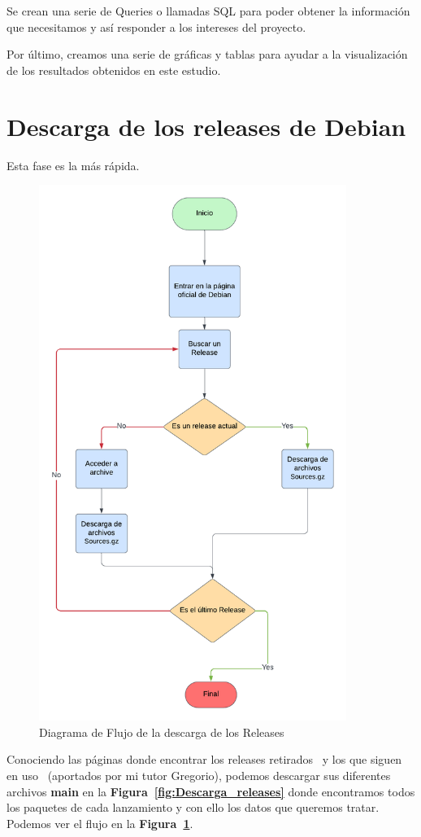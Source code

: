 \documentclass[a4paper, 12pt]{book}
\begin{document}
Se crean una serie de Queries o llamadas SQL para poder obtener la información que necesitamos y así responder a los intereses del proyecto.

Por último, creamos una serie de gráficas y tablas para ayudar a la visualización de los resultados obtenidos en este estudio.


\section{Descarga de los releases de Debian} 
\label{sec:Descarga_de_los_releases_de_Debian}

Esta fase es la más rápida. 
\begin{figure}
	\centering
	\includegraphics[width=10cm, keepaspectratio]{img/Descarga Releases.png}
	\caption{Diagrama de Flujo de la descarga de los Releases}
	\label{fig:flow_descarga}
\end{figure}
Conociendo las páginas donde encontrar los releases retirados~\cite{debian:_releases_archive} y los que siguen en uso~\cite{debian:_releases} (aportados por mi tutor Gregorio), podemos descargar sus diferentes archivos \textbf{main} en la \textbf{Figura~\ref{fig:Descarga_releases}} donde encontramos todos los paquetes de cada lanzamiento y con ello los datos que queremos tratar. Podemos ver el flujo en la \textbf{Figura~\ref{fig:flow_descarga}}.
\end{document}
